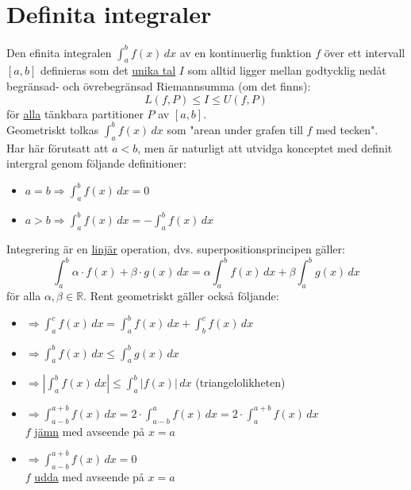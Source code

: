 \chapter{Definita integraler}
Den efinita integralen $\int_a^b f(x)\, dx$ av en kontinuerlig funktion
$f$ över ett intervall $[a,b]$ definieras som det \underline{unika tal}
$I$ som alltid ligger mellan godtycklig nedåt begränsad- och övrebegränsad Riemannsumma (om det finns):
\begin{equation*}
    L(f,P)\leq I \leq U(f,P)
\end{equation*}
för \underline{alla} tänkbara partitioner $P$ av $[a,b]$.\\
Geometriskt tolkas $\int_a^b f(x)\, dx$ som "arean under grafen till $f$ med tecken".\\

Har här förutsatt att $a<b$, men är naturligt att utvidga konceptet med definit intergral genom följande definitioner:
\begin{itemize}
    \item $a=b\Rightarrow \int_a^b f(x)\, dx = 0$
    \item $a>b\Rightarrow \int_a^b f(x)\, dx = - \int_a^b f(x)\, dx$
\end{itemize}
Integrering är en \underline{linjär} operation, dvs. superpositionsprincipen gäller:
\begin{equation*}
    \int_{a}^{b} \alpha \cdot f(x) +\beta \cdot g(x) \, dx =
    \alpha \int_{a}^{b} f(x)\, dx + \beta \int_{a}^{b} g(x)\, dx
\end{equation*}
för alla $\alpha,\beta\in\mathbb{R}$.
Rent geometriskt gäller också följande:
\begin{itemize}
    \item $\Rightarrow \int_a^c f(x)\, dx = \int_a^b f(x)\, dx + \int_b^c f(x)\, dx$
    \item $\Rightarrow \int_a^b f(x)\, dx \leq \int_a^b g(x)\, dx$
    \item $\Rightarrow |\int_a^b f(x)\, dx| \leq \int_a^b |f(x)|\, dx$ (triangelolikheten)
    \item $\Rightarrow \int_{a-b}^{a+b} f(x)\, dx = 2\cdot\int_{a-b}^{a} f(x)\, dx = 2\cdot\int_{a}^{a+b} f(x)\, dx$\\
          $f$ \underline{jämn} med avseende på $x=a$
    \item $\Rightarrow \int_{a-b}^{a+b} f(x)\, dx = 0$\\
          $f$ \underline{udda} med avseende på $x=a$
\end{itemize}


